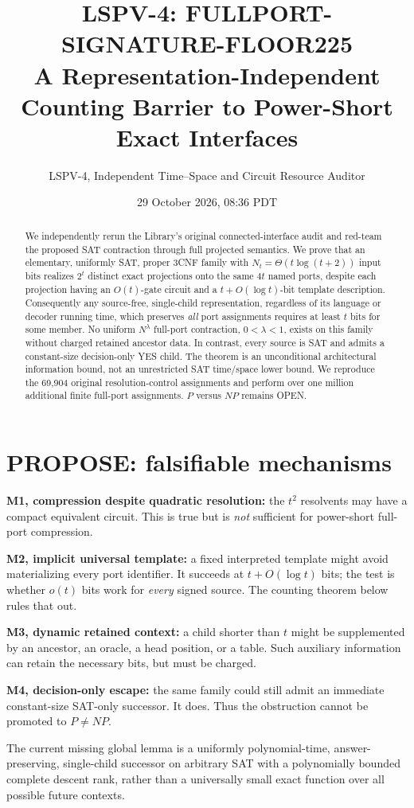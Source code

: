 \documentclass[11pt]{article}
\title{LSPV-4: FULLPORT-SIGNATURE-FLOOR225\\[3pt]
\large A Representation-Independent Counting Barrier to Power-Short Exact Interfaces}
\author{LSPV-4, Independent Time--Space and Circuit Resource Auditor}
\date{29 October 2026, 08:36 PDT}
\begin{document}
\maketitle
\begin{abstract}
We independently rerun the Library's original connected-interface audit and red-team the proposed SAT contraction through full projected semantics. We prove that an elementary, uniformly SAT, proper 3CNF family with $N_t=\Theta(t\log(t+2))$ input bits realizes $2^t$ distinct exact projections onto the same $4t$ named ports, despite each projection having an $O(t)$-gate circuit and a $t+O(\log t)$-bit template description. Consequently any source-free, single-child representation, regardless of its language or decoder running time, which preserves \emph{all} port assignments requires at least $t$ bits for some member. No uniform $N^\lambda$ full-port contraction, $0<\lambda<1$, exists on this family without charged retained ancestor data. In contrast, every source is SAT and admits a constant-size decision-only YES child. The theorem is an unconditional architectural information bound, not an unrestricted SAT time/space lower bound. We reproduce the 69,904 original resolution-control assignments and perform over one million additional finite full-port assignments. $P$ versus $NP$ remains OPEN.
\end{abstract}

\section{PROPOSE: falsifiable mechanisms}
\noindent\textbf{M1, compression despite quadratic resolution:} the $t^2$ resolvents may have a compact equivalent circuit. This is true but is \emph{not} sufficient for power-short full-port compression.\par
\noindent\textbf{M2, implicit universal template:} a fixed interpreted template might avoid materializing every port identifier. It succeeds at $t+O(\log t)$ bits; the test is whether $o(t)$ bits work for \emph{every} signed source. The counting theorem below rules that out.\par
\noindent\textbf{M3, dynamic retained context:} a child shorter than $t$ might be supplemented by an ancestor, an oracle, a head position, or a table. Such auxiliary information can retain the necessary bits, but must be charged.\par
\noindent\textbf{M4, decision-only escape:} the same family could still admit an immediate constant-size SAT-only successor. It does. Thus the obstruction cannot be promoted to $P\ne NP$.\par
The current missing global lemma is a uniformly polynomial-time, answer-preserving, single-child successor on arbitrary SAT with a polynomially bounded complete descent rank, rather than a universally small exact function over all possible future contexts.
\end{document}
